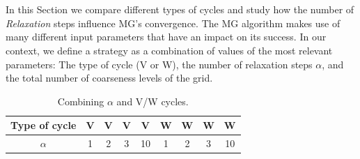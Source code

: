 \section{}
\label{sec:pruning}

\subsection{}

In this Section we compare different types of cycles and study how the number
of \textit{Relaxation} steps influence MG's convergence.  The MG algorithm
makes use of many different input parameters that have an impact on its
success.  In our context, we define a strategy as a combination of values of
the most relevant parameters: The type of cycle (V or W), the number of
relaxation steps $\alpha$, and the total number of coarseness levels of the
grid.








\begin{table}[hbt]
 \begin{center}
  \begin{tabular}{|c|c|c|c|c|c|c|c|c|}
   \hline
   Type of cycle & V & V & V & V & W & W & W & W \\
   \hline
   $\alpha$ & 1 & 2 & 3 & 10 & 1 & 2 & 3 & 10 \\
   \hline
  \end{tabular}
 \end{center}
 \caption{Combining $\alpha$ and V/W cycles.}
 \label{table.strat1}
\end{table}

